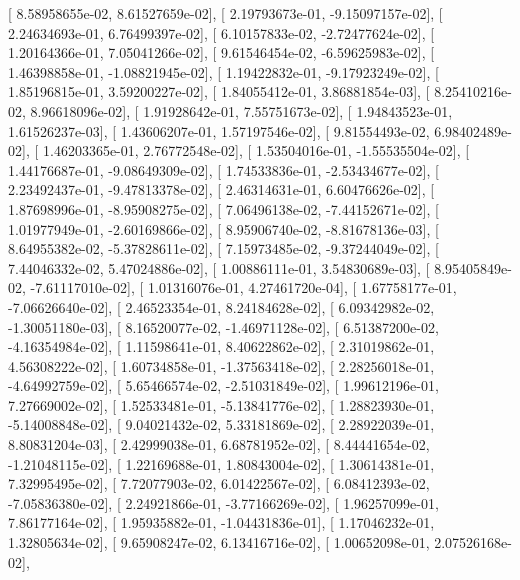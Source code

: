 \documentclass{article}
\begin{document}
       [  8.58958655e-02,   8.61527659e-02],
       [  2.19793673e-01,  -9.15097157e-02],
       [  2.24634693e-01,   6.76499397e-02],
       [  6.10157833e-02,  -2.72477624e-02],
       [  1.20164366e-01,   7.05041266e-02],
       [  9.61546454e-02,  -6.59625983e-02],
       [  1.46398858e-01,  -1.08821945e-02],
       [  1.19422832e-01,  -9.17923249e-02],
       [  1.85196815e-01,   3.59200227e-02],
       [  1.84055412e-01,   3.86881854e-03],
       [  8.25410216e-02,   8.96618096e-02],
       [  1.91928642e-01,   7.55751673e-02],
       [  1.94843523e-01,   1.61526237e-03],
       [  1.43606207e-01,   1.57197546e-02],
       [  9.81554493e-02,   6.98402489e-02],
       [  1.46203365e-01,   2.76772548e-02],
       [  1.53504016e-01,  -1.55535504e-02],
       [  1.44176687e-01,  -9.08649309e-02],
       [  1.74533836e-01,  -2.53434677e-02],
       [  2.23492437e-01,  -9.47813378e-02],
       [  2.46314631e-01,   6.60476626e-02],
       [  1.87698996e-01,  -8.95908275e-02],
       [  7.06496138e-02,  -7.44152671e-02],
       [  1.01977949e-01,  -2.60169866e-02],
       [  8.95906740e-02,  -8.81678136e-03],
       [  8.64955382e-02,  -5.37828611e-02],
       [  7.15973485e-02,  -9.37244049e-02],
       [  7.44046332e-02,   5.47024886e-02],
       [  1.00886111e-01,   3.54830689e-03],
       [  8.95405849e-02,  -7.61117010e-02],
       [  1.01316076e-01,   4.27461720e-04],
       [  1.67758177e-01,  -7.06626640e-02],
       [  2.46523354e-01,   8.24184628e-02],
       [  6.09342982e-02,  -1.30051180e-03],
       [  8.16520077e-02,  -1.46971128e-02],
       [  6.51387200e-02,  -4.16354984e-02],
       [  1.11598641e-01,   8.40622862e-02],
       [  2.31019862e-01,   4.56308222e-02],
       [  1.60734858e-01,  -1.37563418e-02],
       [  2.28256018e-01,  -4.64992759e-02],
       [  5.65466574e-02,  -2.51031849e-02],
       [  1.99612196e-01,   7.27669002e-02],
       [  1.52533481e-01,  -5.13841776e-02],
       [  1.28823930e-01,  -5.14008848e-02],
       [  9.04021432e-02,   5.33181869e-02],
       [  2.28922039e-01,   8.80831204e-03],
       [  2.42999038e-01,   6.68781952e-02],
       [  8.44441654e-02,  -1.21048115e-02],
       [  1.22169688e-01,   1.80843004e-02],
       [  1.30614381e-01,   7.32995495e-02],
       [  7.72077903e-02,   6.01422567e-02],
       [  6.08412393e-02,  -7.05836380e-02],
       [  2.24921866e-01,  -3.77166269e-02],
       [  1.96257099e-01,   7.86177164e-02],
       [  1.95935882e-01,  -1.04431836e-01],
       [  1.17046232e-01,   1.32805634e-02],
       [  9.65908247e-02,   6.13416716e-02],
       [  1.00652098e-01,   2.07526168e-02],
\end{document}
